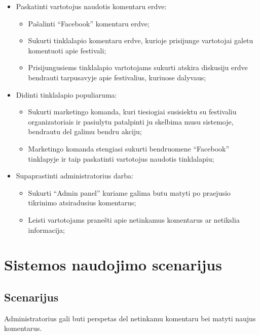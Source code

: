 ﻿\documentclass{VUMIFPSkursinis}
\begin{document}
\begin{itemize}
\begin{itemize}
    \end{itemize}
\item Paskatinti vartotojus naudotis komentaru erdve:
    \begin{itemize}
    \item Pašalinti “Facebook” komentaru erdve;
    \item Sukurti tinklalapio komentaru erdve, kurioje prisijunge vartotojai galetu komentuoti apie festivali;
    \item Prisijungusiems tinklalapio vartotojams sukurti atskira diskusiju erdve bendrauti tarpusavyje apie festivalius, kuriuose dalyvaus;
    \end{itemize}
\item Didinti tinklalapio populiaruma:
    \begin{itemize}
    \item Sukurti marketingo komanda, kuri tiesiogiai susisiektu su festivaliu organizatoriais ir pasiulytu patalpinti ju skelbima musu sistemoje, bendrautu del galimu bendru akciju;
    \item Marketingo komanda stengiasi sukurti bendruomene “Facebook” tinklapyje ir taip paskatinti vartotojus naudotis tinklalapiu;
    \end{itemize}
\item Supaprastinti administratorius darba:
    \begin{itemize}
    \item Sukurti “Admin panel” kuriame galima butu matyti po praejusio tikrinimo atsiradusius komentarus;
    \item Leisti vartotojams pranešti apie netinkamus komentarus ar netikslia informacija;
    \end{itemize}
\end{itemize}

\section{Sistemos naudojimo scenarijus}
\subsection{Scenarijus}

Administratorius gali buti perspetas del netinkamu komentaru bei matyti naujus komentarus.
\end{document}
